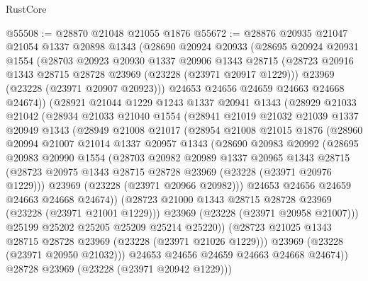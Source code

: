 \begin{lexlean}{RustCore}
\begin{coremodule}
@55508 := @28870 @21048 @21055 @1876
@55672 := @28876
    @20935
    @21047
    @21054
    @1337
    @20898
    @1343
    (@28690
      @20924
      @20933
      (@28695
        @20924
        @20931
        @1554
        (@28703
          @20923
          @20930
          @1337
          @20906
          @1343
          @28715
          (@28723 @20916 @1343 @28715 @28728 @23969 (@23228 (@23971 @20917 @1229)))
          @23969
          (@23228 (@23971 @20907 @20923)))
        @24653
        @24656
        @24659
        @24663
        @24668
        @24674))
    (@28921
      @21044
      @1229
      @1243
      @1337
      @20941
      @1343
      (@28929
        @21033
        @21042
        (@28934
          @21033
          @21040
          @1554
          (@28941
            @21019
            @21032
            @21039
            @1337
            @20949
            @1343
            (@28949
              @21008
              @21017
              (@28954
                @21008
                @21015
                @1876
                (@28960
                  @20994
                  @21007
                  @21014
                  @1337
                  @20957
                  @1343
                  (@28690
                    @20983
                    @20992
                    (@28695
                      @20983
                      @20990
                      @1554
                      (@28703
                        @20982
                        @20989
                        @1337
                        @20965
                        @1343
                        @28715
                        (@28723 @20975 @1343 @28715 @28728 @23969 (@23228 (@23971 @20976 @1229)))
                        @23969
                        (@23228 (@23971 @20966 @20982)))
                      @24653
                      @24656
                      @24659
                      @24663
                      @24668
                      @24674))
                  (@28723 @21000 @1343 @28715 @28728 @23969 (@23228 (@23971 @21001 @1229)))
                  @23969
                  (@23228 (@23971 @20958 @21007)))
                @25199
                @25202
                @25205
                @25209
                @25214
                @25220))
            (@28723 @21025 @1343 @28715 @28728 @23969 (@23228 (@23971 @21026 @1229)))
            @23969
            (@23228 (@23971 @20950 @21032)))
          @24653
          @24656
          @24659
          @24663
          @24668
          @24674))
      @28728
      @23969
      (@23228 (@23971 @20942 @1229)))

\end{coremodule}
\end{lexlean}
